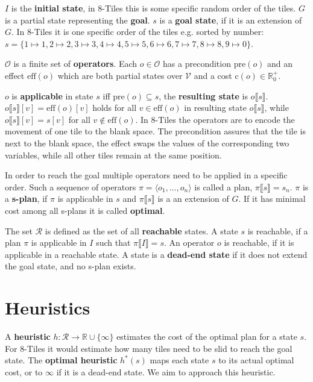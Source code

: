 $I$ is the \textbf{initial state}, in 8-Tiles this is some specific random order of the tiles.
$G$ is a partial state representing the \textbf{goal}. $s$ is a \textbf{goal state}, if it is an extension of $G$.
In 8-Tiles it is one specific order of the tiles e.g. sorted by number:
$s = \{1\mapsto1, 2\mapsto2, 3\mapsto3, 4\mapsto4, 5\mapsto5, 6\mapsto6, 7\mapsto7, 8\mapsto8, 9\mapsto0\}$.

$\mathcal{O}$ is a finite set of \textbf{operators}.
Each $o\in\mathcal{O}$ has a precondition $\text{pre}(o)$ and an effect $\text{eff}(o)$ which are both partial states over $\mathcal{V}$ and a cost $\text{c}(o)\in\mathbb{R}^+_0$.

$o$ is \textbf{applicable} in state $s$ iff $\text{pre}(o)\subseteq s$, the \textbf{resulting state} is $o\llbracket s\rrbracket$.
$o\llbracket s\rrbracket[v] = \text{eff}(o)[v]$ holds for all $v\in \text{eff}(o)$ in resulting state $o\llbracket s\rrbracket$, while $o\llbracket s\rrbracket[v]=s[v]$ for all $v\notin \text{eff}(o)$.
In 8-Tiles the operators are to encode the movement of one tile to the blank space.
The precondition assures that the tile is next to the blank space, the effect swaps the values of the corresponding two variables, while all other tiles remain at the same position.

In order to reach the goal multiple operators need to be applied in a specific order.
Such a sequence of operators $\pi=\langle o_1,\dots, o_n\rangle$ is called a plan, $\pi\llbracket s\rrbracket = s_n$.
$\pi$ is a \textbf{s-plan}, if $\pi$ is applicable in $s$ and $\pi\llbracket s\rrbracket$ is a an extension of $G$.
If it has minimal cost among all s-plans it is called \textbf{optimal}.

The set $\mathcal{R}$ is defined as the set of all \textbf{reachable} states.
A state $s$ is reachable, if a plan $\pi$ is applicable in $I$ such that $\pi\llbracket I\rrbracket = s$.
An operator $o$ is reachable, if it is applicable in a reachable state.
A state is a \textbf{dead-end state} if it does not extend the goal state, and no s-plan exists.


\section{Heuristics}\label{sec:heuristics}
A \textbf{heuristic} $h:\mathcal{R} \rightarrow \mathbb{R} \cup \{\infty\} $ estimates the cost of the optimal plan for a state $s$.
For 8-Tiles it would estimate how many tiles need to be slid to reach the goal state.
The \textbf{optimal heuristic} $h^*(s)$ maps each state $s$  to its actual optimal cost, or to $\infty$ if it is a dead-end state.
We aim to approach this heuristic.

